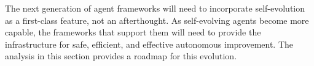 The next generation of agent frameworks will need to incorporate self-evolution as a first-class feature, not an afterthought. As self-evolving agents become more capable, the frameworks that support them will need to provide the infrastructure for safe, efficient, and effective autonomous improvement. The analysis in this section provides a roadmap for this evolution.

